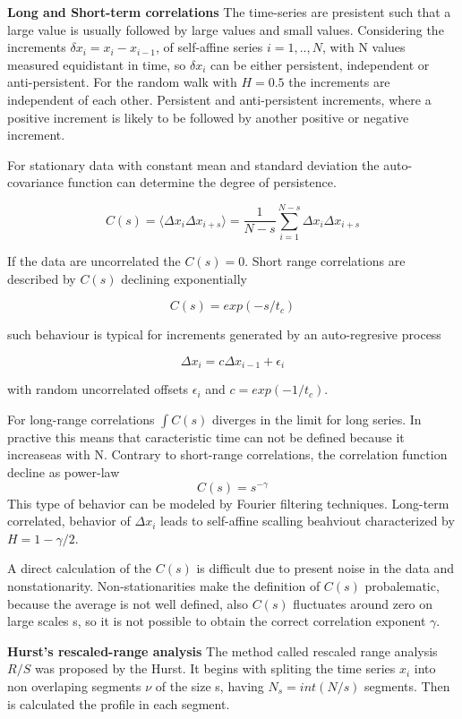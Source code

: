 \textbf{Long and Short-term correlations}
The time-series are presistent such that a large value is usually followed by large values and small values. Considering the increments $\delta x_i = x_i - x_{i-1}$, of self-affine series $i = 1,..,N$, with N values measured equidistant in time, so $\delta x_i$ can be either persistent, independent or anti-persistent. For the random walk with $H=0.5$ the increments are independent of each other. Persistent and anti-persistent increments, where a positive increment is likely to be followed by another positive or negative increment. 

For stationary data with constant mean and standard deviation the auto-covariance function can determine the degree of persistence. 

$$C(s) = \langle \Delta x_i \Delta x_{i+s} \rangle = \frac{1}{N-s} \sum_{i=1}^{N-s}\Delta x_i \Delta x_{i+s} $$ 

If the data are uncorrelated the $C(s)=0$. Short range correlations are described by $C(s)$ declining exponentially

$$C(s) = exp(-s/t_c)$$

such behaviour is typical for increments generated by an auto-regresive process 

$$ \Delta x_i = c\Delta x_{i-1} + \epsilon_i $$

with random uncorrelated offsets $\epsilon_i$ and $c = exp(-1/t_c)$.

For long-range correlations $\int C(s)$ diverges in the limit for long series. In practive this means that caracteristic time can not be defined because it increaseas with N. Contrary to short-range correlations, the correlation function decline as power-law 
$$C(s) = s^{-\gamma}$$
This type of behavior can be modeled by Fourier filtering techniques. Long-term correlated, behavior of $\Delta x_i$ leads to self-affine scalling beahviout characterized by $H=1-\gamma/2$. 

A direct calculation of the $C(s)$ is difficult due to present noise in the data and nonstationarity. Non-stationarities make the definition of $C(s)$ probalematic, because the average is not well defined, also $C(s)$ fluctuates around zero on large scales s, so it is not possible to obtain the correct correlation exponent $\gamma$. 

\textbf{Hurst's rescaled-range analysis}
The method called rescaled range analysis $R/S$ was proposed by the Hurst. It begins with spliting the time series $x_i$ into non overlaping segments $\nu$ of the size s, having $N_s = int(N/s)$ segments. Then is calculated the profile in each segment. 

